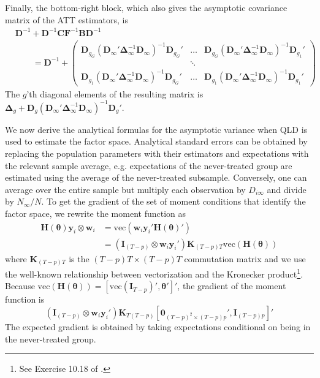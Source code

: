\documentclass[12pt]{article}
\begin{document}
Finally, the bottom-right block, which also gives the asymptotic covariance matrix of the ATT estimators, is 
\begin{align*}
  &\bm D^{-1} + \bm D^{-1} \bm C \bm{F}^{-1} \bm B \bm D^{-1} \\
  &\qquad = \bm D^{-1} + 
  \begin{pmatrix}
      \bm D_{g_G} (\bm D_{\infty}' \bm \Delta_{\infty}^{-1} \bm D_{\infty})^{-1} \bm D_{g_G}' & \hdots & \bm D_{g_G} (\bm D_{\infty}' \bm \Delta_{\infty}^{-1} \bm D_{\infty})^{-1} \bm D_{g_1}'\\
      & \ddots &\\
      \bm D_{g_1} (\bm D_{\infty}' \bm \Delta_{\infty}^{-1} \bm D_{\infty})^{-1} \bm D_{g_G}' & \hdots & \bm D_{g_1} (\bm D_{\infty}' \bm \Delta_{\infty}^{-1} \bm D_{\infty})^{-1} \bm D_{g_1}'
  \end{pmatrix}
\end{align*}
The $g$'th diagonal elements of the resulting matrix is $\bm \Delta_g + \bm D_g (\bm D_{\infty}' \bm \Delta_{\infty}^{-1} \bm D_{\infty})^{-1} \bm D_g'$.

We now derive the analytical formulas for the asymptotic variance when QLD is used to estimate the factor space. Analytical standard errors can be obtained by replacing the population parameters with their estimators and expectations with the relevant sample average, e.g. expectations of the never-treated group are estimated using the average of the never-treated subsample. Conversely, one can average over the entire sample but multiply each observation by $D_{i\infty}$ and divide by $N_{\infty} / N$. To get the gradient of the set of moment conditions that identify the factor space, we rewrite the moment function as 
\begin{align*}
    \bm H(\bm \theta) \bm y_i \otimes \bm w_i
    &= \text{vec}(\bm w_i \bm y_i' \bm H(\bm \theta)')\\
    &= (\bm I_{(T-p)} \otimes \bm w_i \bm y_i') \bm K_{(T-p)T} \text{vec}(\bm H(\bm \theta))
\end{align*}
where $\bm K_{(T-p)T}$ is the $(T-p)T \times (T-p)T$ commutation matrix and we use the well-known relationship between vectorization and the Kronecker product\footnote{See Exercise 10.18 of \citet{abadir2005matrix}.}. Because $\text{vec}(\bm H(\bm \theta)) = [\text{vec}(\bm I_{T-p})', \bm \theta']'$, the gradient of the moment function is 
\begin{equation}
    \left( \bm I_{(T-p)} \otimes \bm w_i \bm y_i' \right) \bm K_{T(T-p)} [\bm 0_{(T-p)^2 \times (T-p)p}', \bm I_{(T-p)p}]'
\end{equation}
The expected gradient is obtained by taking expectations conditional on being in the never-treated group.
\end{document}
